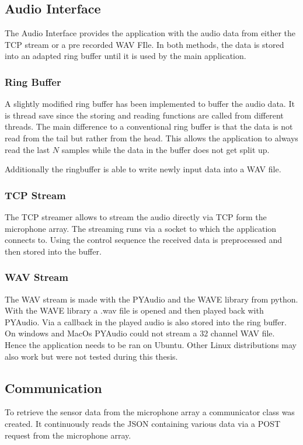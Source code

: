 \subsection{Audio Interface}
The Audio Interface provides the application with the audio data
from either the TCP stream or a pre recorded WAV FIle.
In both methods, the data is stored into an adapted ring buffer
until it is used by the main application.
\subsubsection{Ring Buffer}
A slightly modified ring buffer has been implemented to buffer the
audio data.
It is thread save since the storing and reading functions are called from
different threads.
The main difference to a conventional ring buffer is that the data is not
read from the tail but rather from the head.
This allows the application to always read the last $N$ samples while the data
in the buffer does not get split up.

Additionally the ringbuffer is able to write newly input data into a 
WAV file. 

\subsubsection{TCP Stream}
The TCP streamer allows to stream the audio directly via TCP form the microphone array.
The streaming runs via a socket to which the application connects to.
Using the control sequence the received data is preprocessed and then stored into 
the buffer.

\subsubsection{WAV Stream}
The WAV stream is made with the PYAudio and the WAVE library from python.
With the WAVE library a .wav file is opened and then
played back with PYAudio.
Via a callback in the played audio is also stored into the ring buffer.
On windows and MacOs PYAudio could not stream a 32 channel WAV file.
Hence the application needs to be ran on Ubuntu.
Other Linux distributions may also work but were not tested during
this thesis.

\subsection{Communication}
To retrieve the sensor data from the microphone array
a communicator class was created.
It continuously reads the JSON containing various data 
via a POST request from the microphone array.

